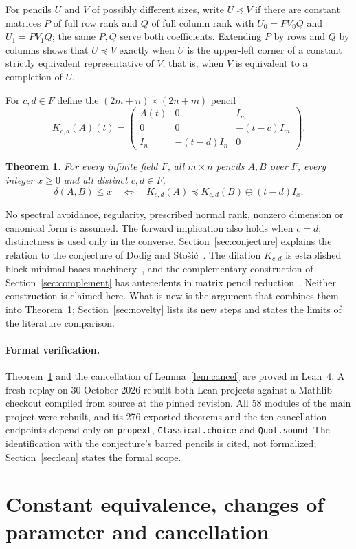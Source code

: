 \documentclass[11pt]{article}
\newtheorem{theorem}{Theorem}
\newcommand{\code}[1]{\nolinkurl{#1}}
\newcommand{\cmp}{\preceq}
\newcommand{\replaystatus}{A fresh replay on 30 October 2026 rebuilt both Lean projects against a Mathlib checkout compiled from source at the pinned revision. All 58 modules of the main project were rebuilt, and its 276 exported theorems and the ten cancellation endpoints depend only on \code{propext}, \code{Classical.choice} and \code{Quot.sound}. The identification with the conjecture's barred pencils is cited, not formalized; Section~\ref{sec:lean} states the formal scope.}
\begin{document}
For pencils $U$ and $V$ of possibly different sizes, write $U\cmp V$ if there are constant matrices $P$ of full row rank and $Q$ of full column rank with $U_0=PV_0Q$ and $U_1=PV_1Q$; the same $P,Q$ serve both coefficients. Extending $P$ by rows and $Q$ by columns shows that $U\cmp V$ exactly when $U$ is the upper-left corner of a constant strictly equivalent representative of $V$, that is, when $V$ is equivalent to a completion of $U$.

For $c,d\in F$ define the $(2m+n)\times(2n+m)$ pencil
\[
K_{c,d}(A)(t)=
\begin{pmatrix}
A(t)&0&I_m\\
0&0&-(t-c)I_m\\
I_n&-(t-d)I_n&0
\end{pmatrix}.
\]

\begin{theorem}\label{thm:main}
For every infinite field $F$, all $m\times n$ pencils $A,B$ over $F$, every integer $x\ge0$ and all distinct $c,d\in F$,
\begin{equation}\label{eq:main}
\delta(A,B)\le x\quad\Longleftrightarrow\quad K_{c,d}(A)\cmp K_{c,d}(B)\oplus(t-d)I_x.
\end{equation}
\end{theorem}

No spectral avoidance, regularity, prescribed normal rank, nonzero dimension or canonical form is assumed. The forward implication also holds when $c=d$; distinctness is used only in the converse. Section~\ref{sec:conjecture} explains the relation to the conjecture of Dodig and Sto\v{s}i\'c~\cite{DS25}. The dilation $K_{c,d}$ is established block minimal bases machinery~\cite{DLPV18}, and the complementary construction of Section~\ref{sec:complement} has antecedents in matrix pencil reduction~\cite{Ver17,NP15}. Neither construction is claimed here. What is new is the argument that combines them into Theorem~\ref{thm:main}; Section~\ref{sec:novelty} lists its new steps and states the limits of the literature comparison.

\paragraph{Formal verification.} Theorem~\ref{thm:main} and the cancellation of Lemma~\ref{lem:cancel} are proved in Lean~4. \replaystatus

\section{Constant equivalence, changes of parameter and cancellation}\label{sec:basic}
\end{document}
